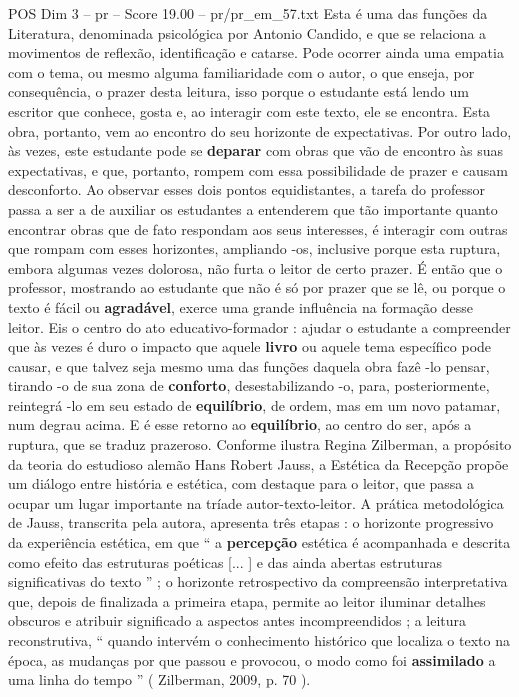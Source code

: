 \begin{textsample}{POS Dim 3 – pr – Score 19.00 – pr/pr\_em\_57.txt}
Esta é uma das funções da Literatura, denominada psicológica por Antonio Candido, e que se relaciona a movimentos de reflexão, identificação e catarse.
Pode ocorrer ainda uma empatia com o tema, ou mesmo alguma familiaridade com o autor, o que enseja, por consequência, o prazer desta leitura, isso porque o estudante está lendo um escritor que conhece, gosta e, ao interagir com este texto, ele se encontra.
Esta obra, portanto, vem ao encontro do seu horizonte de expectativas.
Por outro lado, às vezes, este estudante pode se \textbf{deparar} com obras que vão de encontro às suas expectativas, e que, portanto, rompem com essa possibilidade de prazer e causam desconforto.
Ao observar esses dois pontos equidistantes, a tarefa do professor passa a ser a de auxiliar os estudantes a entenderem que tão importante quanto encontrar obras que de fato respondam aos seus interesses, é interagir com outras que rompam com esses horizontes, ampliando -os, inclusive porque esta ruptura, embora algumas vezes dolorosa, não furta o leitor de certo prazer.
É então que o professor, mostrando ao estudante que não é só por prazer que se lê, ou porque o texto é fácil ou \textbf{agradável}, exerce uma grande influência na formação desse leitor.
Eis o centro do ato educativo-formador : ajudar o estudante a compreender que às vezes é duro o impacto que aquele \textbf{livro} ou aquele tema específico pode causar, e que talvez seja mesmo uma das funções daquela obra fazê -lo pensar, tirando -o de sua zona de \textbf{conforto}, desestabilizando -o, para, posteriormente, reintegrá -lo em seu estado de \textbf{equilíbrio}, de ordem, mas em um novo patamar, num degrau acima.
E é esse retorno ao \textbf{equilíbrio}, ao centro do ser, após a ruptura, que se traduz prazeroso.
Conforme ilustra Regina Zilberman, a propósito da teoria do estudioso alemão Hans Robert Jauss, a Estética da Recepção propõe um diálogo entre história e estética, com destaque para o leitor, que passa a ocupar um lugar importante na tríade autor-texto-leitor.
A prática metodológica de Jauss, transcrita pela autora, apresenta três etapas : o horizonte progressivo da experiência estética, em que “ a \textbf{percepção} estética é acompanhada e descrita como efeito das estruturas poéticas [... ] e das ainda abertas estruturas significativas do texto ” ; o horizonte retrospectivo da compreensão interpretativa que, depois de finalizada a primeira etapa, permite ao leitor iluminar detalhes obscuros e atribuir significado a aspectos antes incompreendidos ; a leitura reconstrutiva, “ quando intervém o conhecimento histórico que localiza o texto na época, as mudanças por que passou e provocou, o modo como foi \textbf{assimilado} a uma linha do tempo ” ( Zilberman, 2009, p. 70 ).

\end{textsample}
